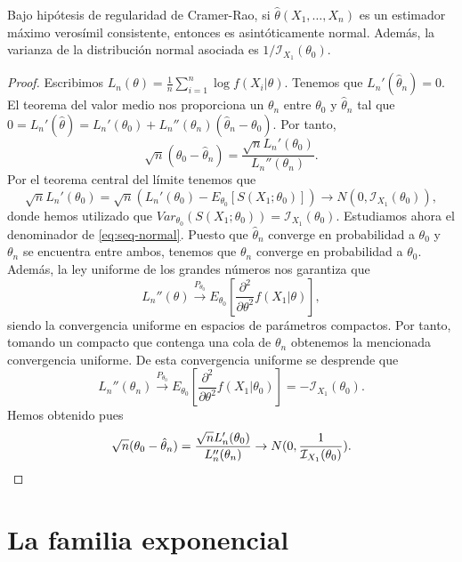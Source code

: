 \documentclass{article}
\begin{document}
    \begin{thm}
        Bajo hipótesis de regularidad de Cramer-Rao, si $\hat{\theta}(X_1, \ldots, X_n)$ es un estimador máximo verosímil consistente, entonces es asintóticamente normal. Además, la varianza de la distribución normal asociada es $1/\mathcal{I}_{X_1}(\theta_0)$.
    \end{thm}
    \begin{proof}
        Escribimos $L_n(\theta) = \frac{1}{n}\sum_{i = 1}^n \log f(X_i|\theta)$. Tenemos que $L_n'(\hat\theta_n) = 0$. El teorema del valor medio nos proporciona un $\theta_n$ entre $\theta_0$ y $\hat\theta_n$ tal que $0 = L_n'(\hat\theta) = L_n'(\theta_0) + L_n''(\theta_n)(\hat\theta_n - \theta_0)$. Por tanto,
        \begin{equation} \label{eq:seq-normal}
            \sqrt{n}(\theta_0 - \hat\theta_n) = \frac{\sqrt{n}L_n'(\theta_0)}{L_n''(\theta_n)}.
        \end{equation}
        Por el teorema central del límite tenemos que
        \[\sqrt{n}L_n'(\theta_0) = \sqrt{n}(L_n'(\theta_0) - E_{\theta_0}[S(X_1; \theta_0)]) \to N(0, \mathcal{I}_{X_1}(\theta_0)),\]
        donde hemos utilizado que $Var_{\theta_0}(S(X_1; \theta_0)) = \mathcal{I}_{X_1}(\theta_0)$.
        Estudiamos ahora el denominador de \eqref{eq:seq-normal}. Puesto que $\hat\theta_n$ converge en probabilidad a $\theta_0$ y $\theta_n$ se encuentra entre ambos, tenemos que $\theta_n$ converge en probabilidad a $\theta_0$. Además, la ley uniforme de los grandes números nos garantiza que
        \[L_n''(\theta) \xrightarrow{P_{\theta_0}} E_{\theta_0}\left[\frac{\partial^2}{\partial \theta^2}f(X_1|\theta)\right],\]
        siendo la convergencia uniforme en espacios de parámetros compactos. Por tanto, tomando un compacto que contenga una cola de $\theta_n$ obtenemos la mencionada convergencia uniforme. De esta convergencia uniforme se desprende que
        \[L_n''(\theta_n) \xrightarrow{P_{\theta_0}} E_{\theta_0}\left[\frac{\partial^2}{\partial \theta^2}f(X_1|\theta_0)\right] = - \mathcal{I}_{X_1}(\theta_0).\]
        Hemos obtenido pues
        \[\sqrt{n}(\theta_0 - \hat\theta_n) = \frac{\sqrt{n}L_n'(\theta_0)}{L_n''(\theta_n)} \rightarrow N(0, \frac{1}{\mathcal{I}_{X_1}(\theta_0)}). \qedhere\]
    \end{proof}

\section{La familia exponencial}
\end{document}
